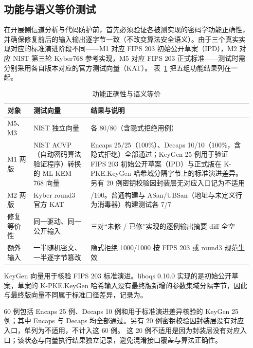 \subsection{功能与语义等价测试}

在开展侧信道分析与代码防护前，首先必须验证各被测实现的密码学功能正确性，并确保修复前后的输入输出逐字节一致（不改变算法安全语义）。由于三个真实实现对应的标准演进阶段不同——M1 对应 FIPS 203 初始公开草案（IPD），M2 对应 NIST 第三轮 Kyber768 参考实现，M5 对应 FIPS 203 正式标准——测试时需分别采用各自版本对应的官方测试向量（KAT）。\cite{fips203}
表~\ref{tab:function} 把五组功能结果列在一起。%

\begin{table}[H]
\centering
\caption{功能正确性与语义等价}
\label{tab:function}
{\small
\begin{tabularx}{\textwidth}{|>{\raggedright\arraybackslash}p{2.5cm}|>{\raggedright\arraybackslash}p{3.5cm}|>{\raggedright\arraybackslash}X|}
\hline
对象 & 测试向量 & 结果与说明 \\
\hline
M5、M3 & NIST 独立向量 & 各 80/80（含隐式拒绝用例） \\
\hline
M1 两版 & NIST ACVP（自动密码算法验证程序）转换的 ML-KEM-768 向量 & Encaps 25/25（100\%）、Decaps 10/10（100\%，含隐式拒绝）全部通过；KeyGen 25 例用于验证 FIPS 203 初始公开草案（IPD）与正式版在 K-PKE.KeyGen 哈希域分隔字节上的标准演进差异。另有 20 例密钥校验因封装层无对应入口记为不适用 \\
\hline
M2 两版 & Kyber round3 官方 KAT & 100/100。普通构建与 ASan/UBSan（地址与未定义行为消毒器）构建测试各 7/7 \\
\hline
修复等价性 & 同一驱动、同一公开输入 & 三对“未修 / 已修”实现的逐例输出摘要 diff 全空 \\
\hline
额外输入 & 一半随机密文、一半逐字节篡改 & 隐式拒绝 1000/1000 按 FIPS 203 或 round3 规范生效 \\
\hline
\end{tabularx}
}
\end{table}

KeyGen 向量用于核验 FIPS 203 标准演进。liboqs 0.10.0 实现的是初始公开草案，草案的 K-PKE.KeyGen 哈希输入没有最终版新增的参数集域分隔字节，因此与最终版向量不同属于标准口径差异，记录为。

60 例包括 Encaps 25 例、Decaps 10 例和用于标准演进差异核验的 KeyGen 25 例；其中 Encaps 与 Decaps 均全部通过。另有 20 例密钥校验因封装层没有对应入口，单列为不适用，不计入这 60 例。
这 20 例不适用是因为封装层没有对应入口；该状态与向量执行结果独立记录，避免混淆接口覆盖与算法正确性。


